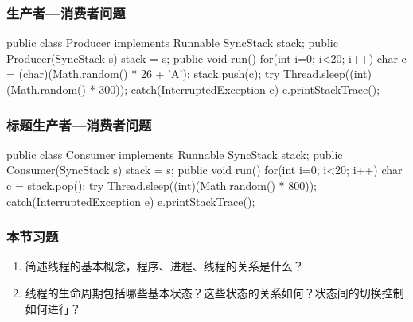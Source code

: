 \begin{frame}[fragile]
  \frametitle{生产者—消费者问题}

  
  \begin{javaCode}
    public class Producer implements Runnable {
      SyncStack stack;
      public Producer(SyncStack s) {
        stack = s;
      }
      public void run() {
        for(int i=0; i<20; i++) {
          char c = (char)(Math.random() * 26 + 'A');
          stack.push(c);
          try {
            Thread.sleep((int)(Math.random() * 300));
          } catch(InterruptedException e) {
            e.printStackTrace();
          }
        }
      }
    }    
  \end{javaCode}
\end{frame}

\begin{frame}[fragile]
  \frametitle{标题生产者—消费者问题}

  
  \begin{javaCode}
    public class Consumer implements Runnable {
      SyncStack stack;
      public Consumer(SyncStack s) {
        stack = s;
      }
      public void run() {
        for(int i=0; i<20; i++) {
          char c = stack.pop();
          try {
            Thread.sleep((int)(Math.random() * 800));
          } catch(InterruptedException e) {
            e.printStackTrace();
          }
        }
      }
    }
  \end{javaCode}
\end{frame}

\begin{frame}
  \frametitle{本节习题}
  \begin{enumerate}
  \item 简述线程的基本概念，程序、进程、线程的关系是什么？
  \item 线程的生命周期包括哪些基本状态？这些状态的关系如何？状态间的切换控制如何进行？
  \end{enumerate}
\end{frame}




